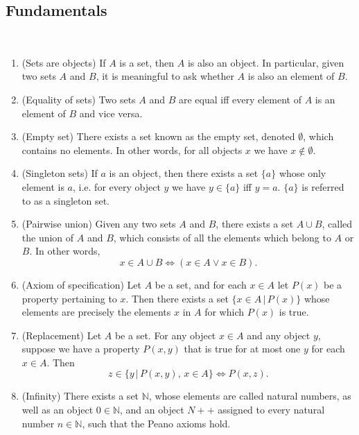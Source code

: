 \documentclass{article}
\begin{document}
\subsection{Fundamentals}
\begin{definition}
	\,
	\begin{enumerate}
		\item (Sets are objects) If \(A\) is a set, then \(A\) is also an object. In particular, given two sets \(A\) and \(B\), it is meaningful to ask whether \(A\) is also an element of \(B\).
		\item (Equality of sets) Two sets \(A\) and \(B\) are equal iff every element of \(A\) is an element of \(B\) and vice versa.
		\item (Empty set) There exists a set known as the empty set, denoted \(\emptyset\), which contains no elements. In other words, for all objects \(x\) we have \(x\notin\emptyset\).
		\item (Singleton sets) If \(a\) is an object, then there exists a set \(\{a\}\) whose only element is \(a\), i.e. for every object \(y\) we have \(y\in\{a\}\) iff \(y=a\). \(\{a\}\) is referred to as a singleton set.
		\item (Pairwise union) Given any two sets \(A\) and \(B\), there exists a set \(A\cup B\), called the union of \(A\) and \(B\), which consists of all the elements which belong to \(A\) or \(B\). In other words,
			\begin{equation*}
				x\in A\cup B\Leftrightarrow(x\in A\vee x\in B).
			\end{equation*}
		\item (Axiom of specification) Let \(A\) be a set, and for each \(x\in A\) let \(P(x)\) be a property pertaining to \(x\). Then there exists a set \(\{x\in A\,|\,P(x)\}\) whose elements are precisely the elements \(x\) in \(A\) for which \(P(x)\) is true.
		\item (Replacement) Let \(A\) be a set. For any object \(x\in A\) and any object \(y\), suppose we have a property \(P(x,y)\) that is true for at most one \(y\) for each \(x\in A\). Then
			\begin{equation*}
				z\in\{y\,|\,P(x,y),\, x\in A\}\Leftrightarrow P(x,z).
			\end{equation*}
		\item (Infinity) There exists a set \(\mathbb{N}\), whose elements are called natural numbers, as well as an object \(0\in\mathbb{N}\), and an object \(N++\) assigned to every natural number \(n\in\mathbb{N}\), such that the Peano axioms hold.
	\end{enumerate}
\end{definition}
\end{document}

